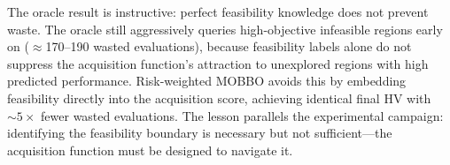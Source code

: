 The oracle result is instructive: perfect feasibility knowledge does not prevent waste. The oracle still aggressively queries high-objective infeasible regions early on ($\approx$170--190 wasted evaluations), because feasibility labels alone do not suppress the acquisition function's attraction to unexplored regions with high predicted performance. Risk-weighted MOBBO avoids this by embedding feasibility directly into the acquisition score, achieving identical final HV with ${\sim}5\times$ fewer wasted evaluations. The lesson parallels the experimental campaign: identifying the feasibility boundary is necessary but not sufficient---the acquisition function must be designed to navigate it.
